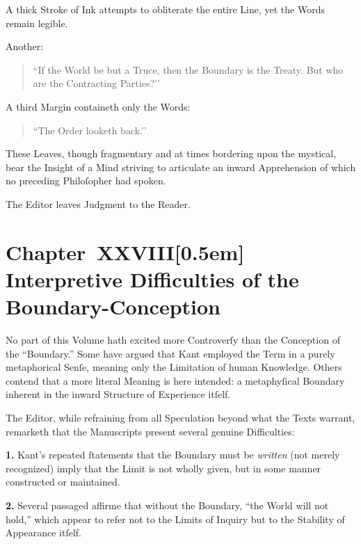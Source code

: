 \documentclass[12pt]{book}
\begin{document}
A thick Stroke of Ink attempts to obliterate the entire Line, yet the Words remain legible.

Another:

\begin{quote}
``If the World be but a Truce, then the Boundary is the Treaty. But who are the Contracting Parties?’’
\end{quote}

A third Margin containeth only the Words:

\begin{quote}
``The Order looketh back.’’
\end{quote}

These Leaves, though fragmentary and at times bordering upon the mystical, bear the Insight of a Mind striving to articulate an inward Apprehension of which no preceding Philoſopher had spoken.

The Editor leaves Judgment to the Reader.


\chapter*{Chapter~XXVIII[0.5em]
Interpretive Difficulties of the Boundary-Conception}


No part of this Volume hath excited more Controverſy than the Conception of the ``Boundary.'' Some have argued that Kant employed the Term in a purely metaphorical Senſe, meaning only the Limitation of human Knowledge. Others contend that a more literal Meaning is here intended: a metaphyſical Boundary inherent in the inward Structure of Experience itſelf.

The Editor, while refraining from all Speculation beyond what the Texts warrant, remarketh that the Manuscripts present several genuine Difficulties:

\medskip

\noindent\textbf{1.} Kant’s repeated ſtatements that the Boundary must be \textit{written} (not merely recognized) imply that the Limit is not wholly given, but in some manner constructed or maintained.

\medskip

\noindent\textbf{2.} Several passaged affirme that without the Boundary, ``the World will not hold,'' which appear to refer not to the Limits of Inquiry but to the Stability of Appearance itſelf.
\end{document}
